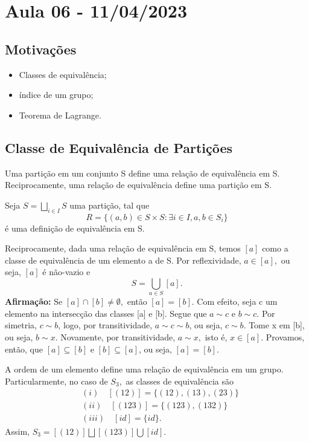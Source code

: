 \documentclass[algebra_notes.tex]{subfiles}
\begin{document}
\section{Aula 06 - 11/04/2023}
\subsection{Motivações}
\begin{itemize}
	\item Classes de equivalência;
	\item índice de um grupo;
	\item Teorema de Lagrange.
\end{itemize}

\subsection{Classe de Equivalência de Partições}
\begin{theorem*}
	Uma partição em um conjunto S define uma relação de equivalência em S. Reciprocamente, uma relação de
	equivalência define uma partição em S.
\end{theorem*}
\begin{proof*}
	Seja $S = \bigsqcup_{i\in I}S$ uma partição, tal que
	$$
		R = \{(a,b)\in S\times S: \exists i\in I, a ,b\in S_{i}\}
	$$
	é uma definição de equivalência em S.

	Reciprocamente, dada uma relação de equivalência em S, temos $[a]$ como a classe de equivalência de um elemento a de S.
	Por reflexividade, $a\in[a],$ ou seja, $[a]$ é não-vazio e
	$$
		S = \bigcup_{a\in S}[a].
	$$
	\textbf{Afirmação:} Se $[a]\cap[b]\neq\emptyset,$ então $[a]=[b].$
	Com efeito, seja c um elemento na intersecção das classes [a] e [b]. Segue que $a\sim c$ e $b\sim c$. Por simetria,
	$c\sim b$, logo, por transitividade, $a\sim c\sim b$, ou seja, $c\sim b$. Tome x em [b], ou seja, $b\sim x.$ Novamente,
	por transitividade, $a\sim x,$ isto é, $x\in[a].$ Provamos, então, que $[a]\subseteq{[b]}$ e $[b]\subseteq{[a]}$, ou seja,
	$[a]=[b].$ \qedsymbol
\end{proof*}
\begin{example*}
	A ordem de um elemento define uma relação de equivalência em um grupo. Particularmente, no caso de $S_{3},$ as classes
	de equivalência são
	\begin{align*}
		 & (i)\quad [(12)]  = \{(12), (13), (23)\} \\
		 & (ii)\quad [(123)] = \{(123), (132)\}    \\
		 & (iii)\quad [id] = \{id\}.
	\end{align*}
	Assim, $S_{3}=[(12)]\bigsqcup{}[(123)]\bigcup{[id]}.$ \qedsymbol
\end{example*}
\end{document}
